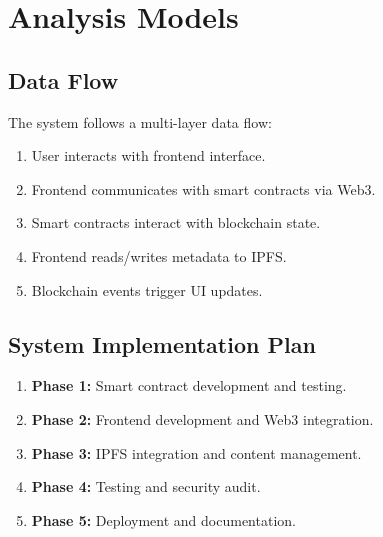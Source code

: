 \section{Analysis Models}

\subsection{Data Flow}

The system follows a multi-layer data flow:

\begin{enumerate}
    \item User interacts with frontend interface.
    \item Frontend communicates with smart contracts via Web3.
    \item Smart contracts interact with blockchain state.
    \item Frontend reads/writes metadata to IPFS.
    \item Blockchain events trigger UI updates.
\end{enumerate}

\subsection{System Implementation Plan}

\begin{enumerate}
    \item \textbf{Phase 1:} Smart contract development and testing.
    \item \textbf{Phase 2:} Frontend development and Web3 integration.
    \item \textbf{Phase 3:} IPFS integration and content management.
    \item \textbf{Phase 4:} Testing and security audit.
    \item \textbf{Phase 5:} Deployment and documentation.
\end{enumerate}